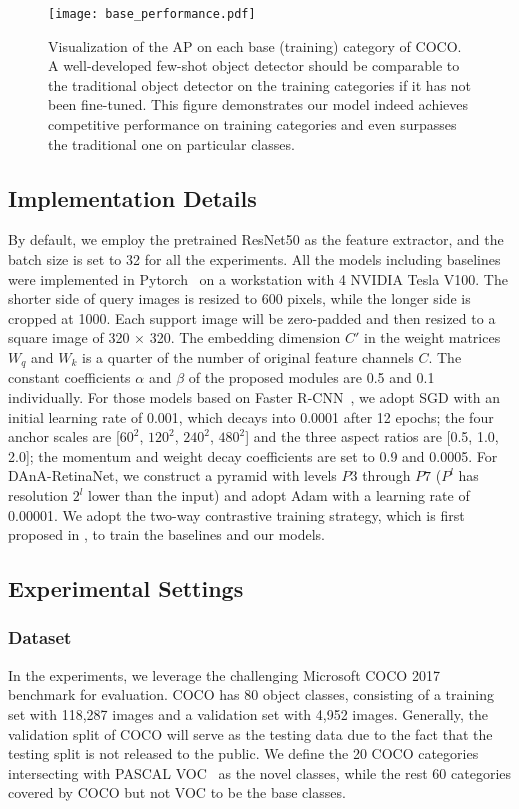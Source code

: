 \documentclass[journal]{IEEEtran}
\begin{document}
\begin{figure*}[t!]
    \centering
    \texttt{[image: base\_performance.pdf]}
    \caption{Visualization of the AP on each base (training) category of COCO. A well-developed few-shot object detector should be comparable to the traditional object detector on the training categories if it has not been fine-tuned. This figure demonstrates our model indeed achieves competitive performance on training categories and even surpasses the traditional one on particular classes.
    }
    \label{fig:base_performance}
\end{figure*} 



\subsection{Implementation Details}
By default, we employ the pretrained ResNet50 as the feature extractor, and the batch size is set to 32 for all the experiments.
All the models including baselines were implemented in Pytorch~\cite{paszke2017automatic} on a workstation with 4 NVIDIA Tesla V100.
The shorter side of query images is resized to 600 pixels, while the longer side is cropped at 1000. 
Each support image will be zero-padded and then resized to a square image of 320 × 320.
The embedding dimension $C'$ in the weight matrices $W_{q}$ and $W_{k}$ is a quarter of the number of original feature channels $C$. 
The constant coefficients $\alpha$ and $\beta$ of the proposed modules are 0.5 and 0.1 individually.
For those models based on Faster R-CNN~\cite{ren2015faster}, we adopt SGD with an initial learning rate of 0.001, which decays into 0.0001 after 12 epochs; the four anchor scales are [$60^2$, $120^2$, $240^2$, $480^2$] and the three aspect ratios are [0.5, 1.0, 2.0]; the momentum and weight decay coefficients are set to 0.9 and 0.0005.
For DAnA-RetinaNet, we construct a pyramid with levels $P3$ through $P7$ ($P^{l}$ has resolution $2^{l}$ lower than the input) and adopt Adam with a learning rate of 0.00001.
We adopt the two-way contrastive training strategy, which is first proposed in \cite{fan2020few}, to train the baselines and our models.






\subsection{Experimental Settings}
\subsubsection{Dataset}
\label{section:dataset}
In the experiments, we leverage the challenging Microsoft COCO 2017~\cite{lin2014microsoft} benchmark for evaluation.
COCO has 80 object classes, consisting of a training set with 118,287 images and a validation set with 4,952 images.
Generally, the validation split of COCO will serve as the testing data due to the fact that the testing split is not released to the public.
We define the 20 COCO categories intersecting with PASCAL VOC~\cite{everingham2010pascal} as the novel classes, while the rest 60 categories covered by COCO but not VOC to be the base classes.
\end{document}
